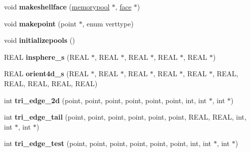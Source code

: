 \begin{DoxyCompactItemize}
\item 
\hypertarget{classtetgenmesh_a98c862e8bb1f1c25e03bb550804028cd}{void {\bfseries makeshellface} (\hyperlink{classtetgenmesh_1_1memorypool}{memorypool} $\ast$, \hyperlink{classtetgenmesh_1_1face}{face} $\ast$)}\label{classtetgenmesh_a98c862e8bb1f1c25e03bb550804028cd}

\item 
\hypertarget{classtetgenmesh_ac6115b981e63664fe06c4a1d4b541737}{void {\bfseries makepoint} (point $\ast$, enum verttype)}\label{classtetgenmesh_ac6115b981e63664fe06c4a1d4b541737}

\item 
\hypertarget{classtetgenmesh_a0ed29d97e57db7035017c312dc6aaa2f}{void {\bfseries initializepools} ()}\label{classtetgenmesh_a0ed29d97e57db7035017c312dc6aaa2f}

\item 
\hypertarget{classtetgenmesh_ae0d6ddfffb8154c7658b8dd17fc51412}{R\-E\-A\-L {\bfseries insphere\-\_\-s} (R\-E\-A\-L $\ast$, R\-E\-A\-L $\ast$, R\-E\-A\-L $\ast$, R\-E\-A\-L $\ast$, R\-E\-A\-L $\ast$)}\label{classtetgenmesh_ae0d6ddfffb8154c7658b8dd17fc51412}

\item 
\hypertarget{classtetgenmesh_ac73e403159c27dbb3d6cbf99f01925dd}{R\-E\-A\-L {\bfseries orient4d\-\_\-s} (R\-E\-A\-L $\ast$, R\-E\-A\-L $\ast$, R\-E\-A\-L $\ast$, R\-E\-A\-L $\ast$, R\-E\-A\-L $\ast$, R\-E\-A\-L, R\-E\-A\-L, R\-E\-A\-L, R\-E\-A\-L, R\-E\-A\-L)}\label{classtetgenmesh_ac73e403159c27dbb3d6cbf99f01925dd}

\item 
\hypertarget{classtetgenmesh_a6dbb29feba157ab5d848921fa0a11c08}{int {\bfseries tri\-\_\-edge\-\_\-2d} (point, point, point, point, point, point, int, int $\ast$, int $\ast$)}\label{classtetgenmesh_a6dbb29feba157ab5d848921fa0a11c08}

\item 
\hypertarget{classtetgenmesh_a719a8d28b08865c073395b2650c7b477}{int {\bfseries tri\-\_\-edge\-\_\-tail} (point, point, point, point, point, point, R\-E\-A\-L, R\-E\-A\-L, int, int $\ast$, int $\ast$)}\label{classtetgenmesh_a719a8d28b08865c073395b2650c7b477}

\item 
\hypertarget{classtetgenmesh_ad7597699d6fc2771701cfd85673d39f9}{int {\bfseries tri\-\_\-edge\-\_\-test} (point, point, point, point, point, point, int, int $\ast$, int $\ast$)}\label{classtetgenmesh_ad7597699d6fc2771701cfd85673d39f9}


\end{DoxyCompactItemize}
